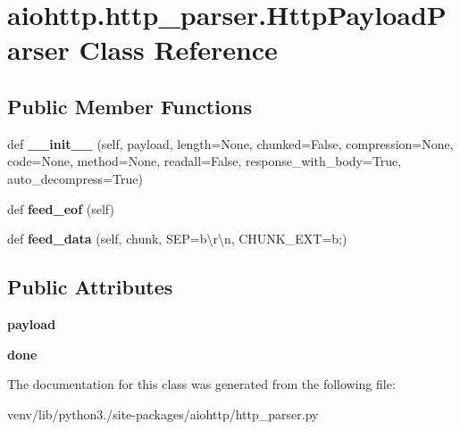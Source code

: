 \hypertarget{classaiohttp_1_1http__parser_1_1_http_payload_parser}{}\section{aiohttp.\+http\+\_\+parser.\+Http\+Payload\+Parser Class Reference}
\label{classaiohttp_1_1http__parser_1_1_http_payload_parser}
\subsection*{Public Member Functions}
\begin{DoxyCompactItemize}
\item 
\mbox{\label{classaiohttp_1_1http__parser_1_1_http_payload_parser_a3eb214f95963fa11f1024aab0e3c9365}} 
def {\bfseries \+\_\+\+\_\+init\+\_\+\+\_\+} (self, payload, length=None, chunked=False, compression=None, code=None, method=None, readall=False, response\+\_\+with\+\_\+body=True, auto\+\_\+decompress=True)
\item 
\mbox{\label{classaiohttp_1_1http__parser_1_1_http_payload_parser_a4096242ae155c8beb2fc0030ef02d1f8}} 
def {\bfseries feed\+\_\+eof} (self)
\item 
\mbox{\label{classaiohttp_1_1http__parser_1_1_http_payload_parser_abc4a30f4b4d6b82cac5fcaf66202d306}} 
def {\bfseries feed\+\_\+data} (self, chunk, S\+EP=b\textquotesingle{}\textbackslash{}r\textbackslash{}n\textquotesingle{}, C\+H\+U\+N\+K\+\_\+\+E\+XT=b\textquotesingle{};\textquotesingle{})
\end{DoxyCompactItemize}
\subsection*{Public Attributes}
\begin{DoxyCompactItemize}
\item 
\mbox{\label{classaiohttp_1_1http__parser_1_1_http_payload_parser_afa712cbdc9c940275a2795d68adc3f13}} 
{\bfseries payload}
\item 
\mbox{\label{classaiohttp_1_1http__parser_1_1_http_payload_parser_a9330b39795e7bb844cb72f31c2f4e5f5}} 
{\bfseries done}
\end{DoxyCompactItemize}


The documentation for this class was generated from the following file\+:\begin{DoxyCompactItemize}
\item 
venv/lib/python3./site-\/packages/aiohttp/http\+\_\+parser.\+py\end{DoxyCompactItemize}
